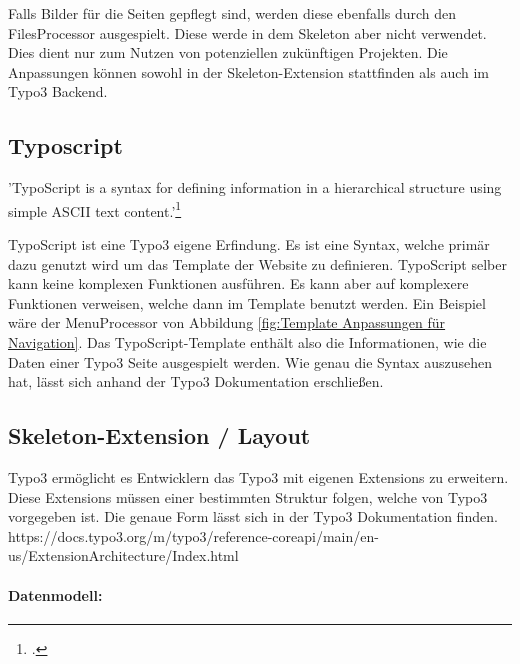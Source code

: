 Falls Bilder für die Seiten gepflegt sind, werden diese ebenfalls durch den FilesProcessor ausgespielt. Diese werde in dem Skeleton aber nicht verwendet. Dies dient nur zum Nutzen von potenziellen zukünftigen Projekten. Die Anpassungen können sowohl in der Skeleton-Extension stattfinden als auch im Typo3 Backend.

\subsection{Typoscript}
\label{sec:Typoscript}

'TypoScript is a syntax for defining information in a hierarchical structure using simple ASCII text content.'\footnote{\Vgl \citet{TypoScript}.}

TypoScript ist eine Typo3 eigene Erfindung. Es ist eine Syntax, welche primär dazu genutzt wird um das Template der Website zu definieren. TypoScript selber kann keine komplexen Funktionen ausführen. Es kann aber auf komplexere Funktionen verweisen, welche dann im Template benutzt werden. Ein Beispiel wäre der MenuProcessor von Abbildung \ref{fig:Template Anpassungen für Navigation}. Das TypoScript-Template enthält also die Informationen, wie die Daten einer Typo3 Seite ausgespielt werden. Wie genau die Syntax auszusehen hat, lässt sich anhand der Typo3 Dokumentation erschließen.

\subsection{Skeleton-Extension / Layout}
\label{sec:Skeleton-Extension / Layout}
Typo3 ermöglicht es Entwicklern das Typo3 mit eigenen Extensions zu erweitern. Diese Extensions müssen einer bestimmten Struktur folgen, welche von Typo3 vorgegeben ist. Die genaue Form lässt sich in der Typo3 Dokumentation finden. \newline https://docs.typo3.org/m/typo3/reference-coreapi/main/en-us/ExtensionArchitecture/Index.html
\paragraph{Datenmodell:}

